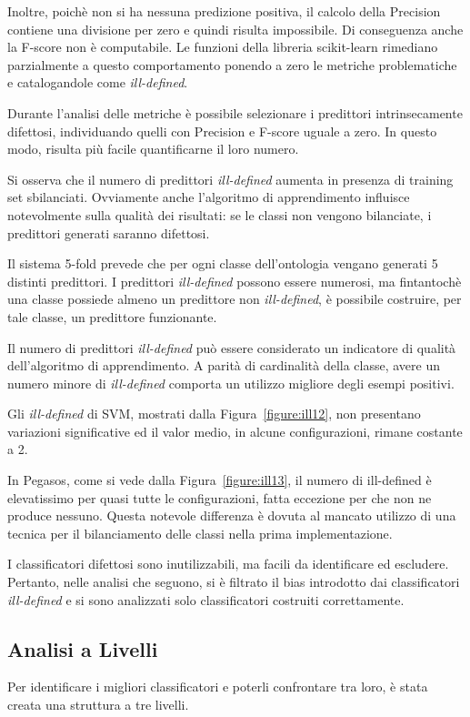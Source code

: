 Inoltre, poichè non si ha nessuna predizione positiva, il calcolo della Precision contiene una divisione per zero e quindi risulta impossibile. Di conseguenza anche la F-score non è computabile. Le funzioni della libreria scikit-learn rimediano parzialmente a questo comportamento ponendo a zero le metriche problematiche e catalogandole come \emph{ill-defined}.

Durante l'analisi delle metriche è possibile selezionare i predittori intrinsecamente difettosi, individuando quelli con Precision e F-score uguale a zero. In questo modo, risulta più facile quantificarne il loro numero.

Si osserva che il numero di predittori \emph{ill-defined} aumenta in presenza di training set sbilanciati. Ovviamente anche l'algoritmo di apprendimento influisce notevolmente sulla qualità dei risultati: se le classi non vengono bilanciate, i predittori generati saranno difettosi.

Il sistema 5-fold prevede che per ogni classe dell'ontologia vengano generati 5 distinti predittori. I predittori \emph{ill-defined} possono essere numerosi, ma fintantochè una classe possiede almeno un predittore non \emph{ill-defined}, è possibile costruire, per tale classe, un predittore funzionante.

Il numero di predittori \emph{ill-defined} può essere considerato un indicatore di qualità dell'algoritmo di apprendimento. A parità di cardinalità della classe, avere un numero minore di \emph{ill-defined} comporta un utilizzo migliore degli esempi positivi.

Gli \emph{ill-defined} di SVM, mostrati dalla Figura~\ref{figure:ill12}, non presentano variazioni significative ed il valor medio, in alcune configurazioni, rimane costante a 2.

In Pegasos, come si vede dalla Figura~\ref{figure:ill13}, il numero di ill-defined è elevatissimo per quasi tutte le configurazioni, fatta eccezione per  che non ne produce nessuno. Questa notevole differenza è dovuta al mancato utilizzo di una tecnica per il bilanciamento delle classi nella prima implementazione.

I classificatori difettosi sono inutilizzabili, ma facili da identificare ed escludere. Pertanto, nelle analisi che seguono, si è filtrato il bias introdotto dai classificatori \emph{ill-defined} e si sono analizzati solo classificatori costruiti correttamente.

\subsection{Analisi a Livelli}
Per identificare i migliori classificatori e poterli confrontare tra loro, è stata creata una struttura a tre livelli.

